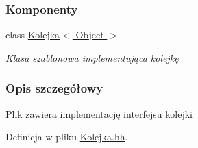 \subsubsection*{Komponenty}
\begin{DoxyCompactItemize}
\item 
class \hyperlink{class_kolejka}{Kolejka$<$ Object $>$}
\begin{DoxyCompactList}\small\item\em Klasa szablonowa implementująca kolejkę \end{DoxyCompactList}\end{DoxyCompactItemize}


\subsubsection{Opis szczegółowy}
Plik zawiera implementację interfejsu kolejki 

Definicja w pliku \hyperlink{_kolejka_8hh_source}{Kolejka.\-hh}.

